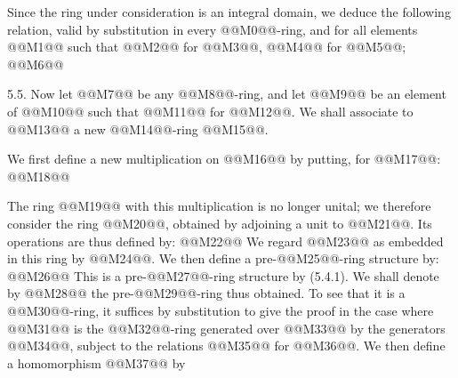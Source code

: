 Since the ring under consideration is an integral domain, we deduce the following relation, valid by substitution in every @@M0@@-ring, and for all elements @@M1@@ such that @@M2@@ for @@M3@@, @@M4@@ for @@M5@@;
@@M6@@

5.5. Now let @@M7@@ be any @@M8@@-ring, and let @@M9@@ be an element of @@M10@@ such that @@M11@@ for @@M12@@. We shall associate to @@M13@@ a new @@M14@@-ring @@M15@@.

We first define a new multiplication on @@M16@@ by putting, for @@M17@@:
@@M18@@

The ring @@M19@@ with this multiplication is no longer unital; we therefore consider the ring @@M20@@, obtained by adjoining a unit to @@M21@@. Its operations are thus defined by:
@@M22@@
We regard @@M23@@ as embedded in this ring by @@M24@@. We then define a pre-@@M25@@-ring structure by:
@@M26@@
This is a pre-@@M27@@-ring structure by (5.4.1). We shall denote by @@M28@@ the pre-@@M29@@-ring thus obtained. To see that it is a @@M30@@-ring, it suffices by substitution to give the proof in the case where @@M31@@ is the @@M32@@-ring generated over @@M33@@ by the generators @@M34@@, subject to the relations @@M35@@ for @@M36@@. We then define a homomorphism @@M37@@ by
